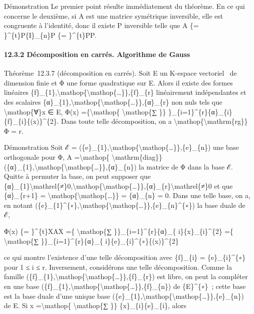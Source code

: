 \documentclass[]{article}
\begin{document}
Démonstration Le premier point résulte immédiatement du théorème. En ce
qui concerne le deuxième, si A est une matrice symétrique inversible,
elle est congruente à l'identité, donc il existe P inversible telle que
A \{= \}\^{}\{t\}P\{I\}\_\{n\}P \{= \}\^{}\{t\}PP.

\paragraph{12.3.2 Décomposition en carrés. Algorithme de Gauss}

Théorème~12.3.7 (décomposition en carrés). Soit E un K-espace vectoriel
~de dimension finie et Φ une forme quadratique sur E. Alors il existe
des formes linéaires
\{f\}\_\{1\},\textbackslash{}mathop\{\textbackslash{}mathop\{\ldots{}\}\},\{f\}\_\{r\}
linéairement indépendantes et des scalaires
\{α\}\_\{1\},\textbackslash{}mathop\{\textbackslash{}mathop\{\ldots{}\}\},\{α\}\_\{r\}
non nuls tels que \textbackslash{}mathop\{∀\}x ∈ E, Φ(x)
=\{\textbackslash{}mathop\{ \textbackslash{}mathop\{∑ \}\}
\}\_\{i=1\}\^{}\{r\}\{α\}\_\{i\}\{f\}\_\{i\}\{(x)\}\^{}\{2\}. Dans toute
telle décomposition, on a
\textbackslash{}mathop\{\textbackslash{}mathrm\{rg\}\}Φ = r.

Démonstration Soit ℰ =
(\{e\}\_\{1\},\textbackslash{}mathop\{\textbackslash{}mathop\{\ldots{}\}\},\{e\}\_\{n\})
une base orthogonale pour Φ, A =\textbackslash{}mathop\{
\textbackslash{}mathrm\{diag\}\}(\{α\}\_\{1\},\textbackslash{}mathop\{\textbackslash{}mathop\{\ldots{}\}\},\{α\}\_\{n\})
la matrice de Φ dans la base ℰ. Quitte à permuter la base, on peut
supposer que
\{α\}\_\{1\}\textbackslash{}mathrel\{≠\}0,\textbackslash{}mathop\{\textbackslash{}mathop\{\ldots{}\}\},\{α\}\_\{r\}\textbackslash{}mathrel\{≠\}0
et que \{α\}\_\{r+1\} =
\textbackslash{}mathop\{\textbackslash{}mathop\{\ldots{}\}\} =
\{α\}\_\{n\} = 0. Dans une telle base, on a, en notant
(\{e\}\_\{1\}\^{}\{∗\},\textbackslash{}mathop\{\textbackslash{}mathop\{\ldots{}\}\},\{e\}\_\{n\}\^{}\{∗\})
la base duale de ℰ,

Φ(x) \{= \}\^{}\{t\}XAX =\{ \textbackslash{}mathop\{∑
\}\}\_\{i=1\}\^{}\{r\}\{α\}\_\{ i\}\{x\}\_\{i\}\^{}\{2\} =\{
\textbackslash{}mathop\{∑ \}\}\_\{i=1\}\^{}\{r\}\{α\}\_\{
i\}\{e\}\_\{i\}\^{}\{∗\}\{(x)\}\^{}\{2\}

ce qui montre l'existence d'une telle décomposition avec \{f\}\_\{i\} =
\{e\}\_\{i\}\^{}\{∗\} pour 1 ≤ i ≤ r. Inversement, considérons une telle
décomposition. Comme la famille
(\{f\}\_\{1\},\textbackslash{}mathop\{\textbackslash{}mathop\{\ldots{}\}\},\{f\}\_\{r\})
est libre, on peut la compléter en une base
(\{f\}\_\{1\},\textbackslash{}mathop\{\textbackslash{}mathop\{\ldots{}\}\},\{f\}\_\{n\})
de \{E\}\^{}\{∗\}~; cette base est la base duale d'une unique base
(\{e\}\_\{1\},\textbackslash{}mathop\{\textbackslash{}mathop\{\ldots{}\}\},\{e\}\_\{n\})
de E. Si x =\textbackslash{}mathop\{ \textbackslash{}mathop\{∑ \}\}
\{x\}\_\{i\}\{e\}\_\{i\}, alors
\end{document}
